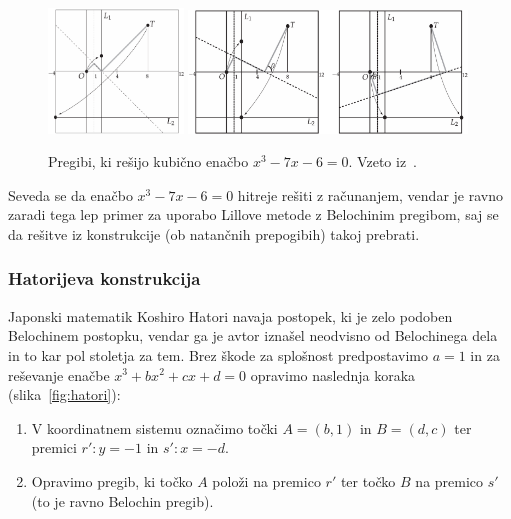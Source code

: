 \begin{figure}[h]
    \centering
    \includegraphics[width=0.32\textwidth]{images/kubična enačba/lill_primer_pregib1.png}
    \includegraphics[width=0.66\textwidth]{images/kubična enačba/lill_primer_pregib2_3.png}
    \caption[Primer reševanja z Lillovo metodo (s pregibi)]{Pregibi, ki rešijo kubično enačbo $x^3 - 7x - 6 = 0$. Vzeto iz~\cite[str. 91--92]{hull2013}.}
    \label{fig:lill_primer_pregibi}
\end{figure}

Seveda se da enačbo $x^3 - 7x - 6 = 0$ hitreje rešiti z računanjem, vendar je ravno zaradi tega lep primer za uporabo Lillove metode z Belochinim pregibom, saj se da rešitve iz konstrukcije (ob natančnih prepogibih) takoj prebrati.

\subsubsection{Hatorijeva konstrukcija}

Japonski matematik Koshiro Hatori navaja postopek, ki je zelo podoben Belochinem postopku, vendar ga je avtor iznašel neodvisno od Belochinega dela in to kar pol stoletja za tem. Brez škode za splošnost predpostavimo $a = 1$ in za reševanje enačbe $x^3 + bx^2 + cx + d = 0$ opravimo naslednja koraka (slika~\ref{fig:hatori}):
\begin{enumerate}
    \item V koordinatnem sistemu označimo točki $A = (b, 1)$ in $B = (d, c)$ ter premici $r': y = -1$ in $s': x = -d$.
    \item Opravimo pregib, ki točko $A$ položi na premico $r'$ ter točko $B$ na premico $s'$ (to je ravno Belochin pregib).
\end{enumerate}

